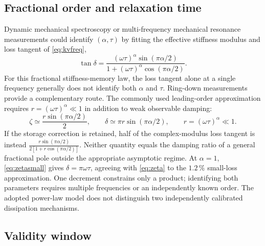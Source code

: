 \subsection{Fractional order and relaxation time}
\label{sec:calib_alpha_tau}

Dynamic mechanical spectroscopy or multi-frequency mechanical resonance
measurements could identify $(\alpha,\tau)$ by fitting the effective
stiffness modulus and loss tangent of \eqref{eq:kvfreq},
\begin{equation}
  \tan\delta=\frac{(\omega\tau)^{\alpha}\sin(\pi\alpha/2)}
     {1+(\omega\tau)^{\alpha}\cos(\pi\alpha/2)}.
  \label{eq:tandelta}
\end{equation}
For this fractional stiffness-memory law, the loss tangent alone at a
single frequency generally does not identify both $\alpha$ and $\tau$.
Ring-down measurements provide a complementary route. The commonly used
leading-order approximation requires
$r=(\omega\tau)^\alpha\ll1$ in addition to weak observable damping:
\begin{equation}
  \zeta\simeq\frac{r\sin(\pi\alpha/2)}{2},\qquad
  \delta\simeq\pi r\sin(\pi\alpha/2),\qquad
  r=(\omega\tau)^\alpha\ll1.
  \label{eq:zetasmall}
\end{equation}
If the storage correction is retained, half of the complex-modulus loss
tangent is instead
$\frac{r\sin(\pi\alpha/2)}{2[1+r\cos(\pi\alpha/2)]}$.
Neither quantity equals the damping ratio of a general fractional pole
outside the appropriate asymptotic regime.
At $\alpha=1$, \eqref{eq:zetasmall} gives $\delta=\pi\omega\tau$, agreeing
with \eqref{eq:zeta} to the $1.2\,\%$ small-loss approximation. One decrement
constrains only a product; identifying both parameters requires multiple
frequencies or an independently known order. The adopted power-law model does not distinguish two independently
calibrated dissipation mechanisms.

\subsection{Validity window}
\label{sec:limit_window}


